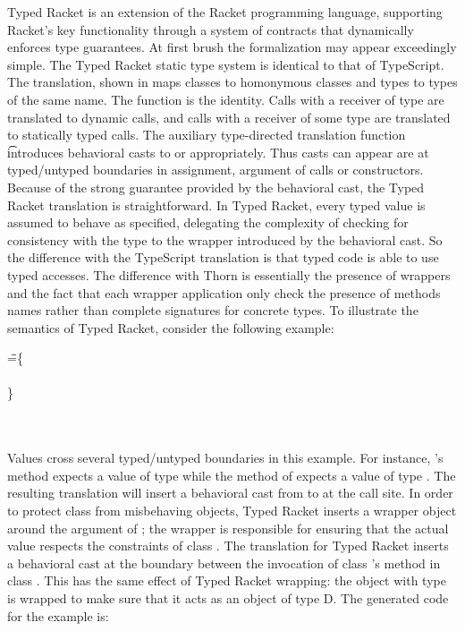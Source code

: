 \documentclass[acmsmall, anonymous, authordraft, review]{acmart} %
\begin{document}
Typed Racket is an extension of the Racket programming language, supporting
Racket's key functionality through a system of contracts that dynamically
enforces type guarantees.  At first brush the formalization may appear
exceedingly simple.  The Typed Racket static type system is identical to
that of TypeScript. The translation, shown in  maps classes to
homonymous classes and types to types of the same name. The  function
is the identity.  Calls with a receiver of type \any are translated to
\kafka dynamic calls, and calls with a receiver of some type \C are
translated to statically typed calls. The auxiliary type-directed
translation function \TAG\e\Env\t introduces behavioral casts to \any or \C
appropriately. Thus casts can appear are at typed/untyped boundaries in
assignment, argument of calls or constructors. Because of the strong
guarantee provided by the behavioral cast, the Typed Racket translation is
straightforward. In Typed Racket, every typed value is assumed to behave as
specified, delegating the complexity of checking for consistency with the
type to the wrapper introduced by the behavioral cast.  So the difference
with the TypeScript translation is that typed code is able to use typed
accesses. The difference with Thorn is essentially the presence of wrappers
and the fact that each wrapper application only check the presence of
methods names rather than complete signatures for concrete types.  To
illustrate the semantics of Typed Racket, consider the following example:

\medskip
\begin{minipage}{\textwidth}
\begin{tabbing}
 \HS\HS\HS
  \Call{\New\A{}}\m{\New\C{}}
  \HS\HS\HS\HS \WHERE \HS\K\HS=\HS\=
  \class\=  \A \{ \\
  \>\HS \Mdef\m\x\any\any{ ~ \Call{\New\D{}}\m\x ~} \\
  \> \}\\
 \> \Class \C{}{\Mdef\m\x\any\any{~\x~}} \\
 \> \Class \D{}{\Mdef\m\x\D\D{~\Call\x\m\x~}} \\
\end{tabbing}
\end{minipage}
\medskip

\noindent Values cross several typed/untyped boundaries in this example.
For instance, \A's method \m expects a value of type \any while the method 
\m of \D expects a value of type \D.  The resulting
translation will insert a behavioral cast from \any to \D at the call site.  
In order to protect class \D from misbehaving objects, Typed Racket inserts a wrapper
object around the argument of \D; the wrapper is responsible for ensuring
that the actual value respects the constraints of class \D.  The \kafka
translation for Typed Racket inserts a behavioral cast at the boundary
between the invocation of class \D's method \m in class \A.  This has the
same effect of Typed Racket wrapping: the object with type \C is wrapped to
make sure that it acts as an object of type {\xt D}.  The generated \kafka
code for the example is:
\end{document}
